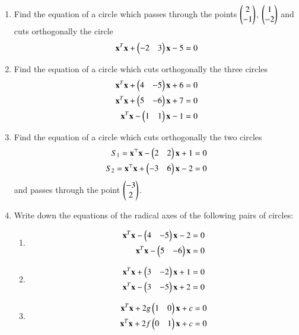 \renewcommand{\theequation}{\theenumi}
\begin{enumerate}[label=\arabic*.,ref=\thesubsection.\theenumi]
\item Find the equation of a circle which passes through the points $\begin{pmatrix}2\\-1\end{pmatrix}$, $\begin{pmatrix}1\\-2\end{pmatrix}$ and cuts orthogonally the circle
\begin{align}
\mathbf{x}^T\mathbf{x}+\begin{pmatrix}-2 & 3\end{pmatrix}\mathbf{x}-5 = 0
\end{align}
\item Find the equation of a circle which cuts orthogonally the three circles
\begin{align}
\mathbf{x}^T\mathbf{x}+\begin{pmatrix}4 & -5\end{pmatrix}\mathbf{x}+6 = 0
\\
\mathbf{x}^T\mathbf{x}+\begin{pmatrix}5 & -6\end{pmatrix}\mathbf{x}+7 = 0
\\
\mathbf{x}^T\mathbf{x}-\begin{pmatrix}1 & 1\end{pmatrix}\mathbf{x}-1 = 0
\end{align}
\item Find the equation of a circle which cuts orthogonally the two circles
\begin{align}
    S_1 = \mathbf{x}^\top\mathbf{x} - \begin{pmatrix}2&2\end{pmatrix}\mathbf{x} + 1 = 0 \label{circle1}\\
    S_2 = \mathbf{x}^\top\mathbf{x} + \begin{pmatrix}-3&6\end{pmatrix}\mathbf{x} - 2 = 0 \label{circle2}
\end{align}
and passes through the point $\begin{pmatrix}-3\\2\end{pmatrix}$.
\\
\solution

\item Write down the equations of the radical axes of the following pairs of circles:
\begin{enumerate}
\item
%
\begin{align}
\mathbf{x}^T\mathbf{x}-\begin{pmatrix}4 & -5\end{pmatrix}\mathbf{x}-2 = 0
\\
\mathbf{x}^T\mathbf{x}-\begin{pmatrix}5 & -6\end{pmatrix}\mathbf{x} = 0
\end{align}
%
\item
\begin{align}
%
\vec{x}^T\vec{x}+\myvec{3 & -2}\vec{x}+1 = 0
\\
\vec{x}^T\vec{x}-\myvec{3 & -5}\vec{x}+2 = 0
\end{align}
%
\item
\begin{align}
%
\vec{x}^T\vec{x}+2g\myvec{1 & 0}\vec{x}+c = 0
\\
\vec{x}^T\vec{x}+2f\myvec{0 & 1}\vec{x}+c = 0

\end{align}
\end{enumerate}
\end{enumerate}
